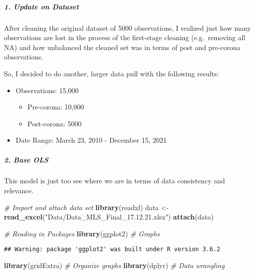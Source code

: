 \documentclass[
]{article}
\newenvironment{Shaded}{\begin{snugshade}}{\end{snugshade}}
\newcommand{\CommentTok}[1]{\textcolor[rgb]{0.56,0.35,0.01}{\textit{#1}}}
\newcommand{\KeywordTok}[1]{\textcolor[rgb]{0.13,0.29,0.53}{\textbf{#1}}}
\newcommand{\NormalTok}[1]{#1}
\newcommand{\StringTok}[1]{\textcolor[rgb]{0.31,0.60,0.02}{#1}}
\providecommand{\tightlist}{%
  \setlength{\itemsep}{0pt}\setlength{\parskip}{0pt}}
\begin{document}
\hypertarget{update-on-dataset}{%
\subparagraph{1. Update on Dataset}\label{update-on-dataset}}

After cleaning the original dataset of 5000 observations, I realized
just how many observations are lost in the process of the first-stage
cleaning (e.g.~removing all NA) and how unbalanced the cleaned set was
in terms of post and pre-corona observations.

So, I decided to do another, larger data pull with the following
results:

\begin{itemize}
\tightlist
\item
  Observations: 15,000

  \begin{itemize}
  \tightlist
  \item
    Pre-corona: 10,000
  \item
    Post-corona: 5000
  \end{itemize}
\item
  Date Range: March 23, 2010 - December 15, 2021
\end{itemize}

\hypertarget{base-ols}{%
\subparagraph{2. Base OLS}\label{base-ols}}

This model is just too see where we are in terms of data consistency and
relevance.

\begin{Shaded}
\begin{Highlighting}[]
\CommentTok{# Import and attach data set }
\KeywordTok{library}\NormalTok{(readxl)}
\NormalTok{data <-}\StringTok{ }\KeywordTok{read_excel}\NormalTok{(}\StringTok{"Data/Data_MLS_Final_17.12.21.xlsx"}\NormalTok{)}
\KeywordTok{attach}\NormalTok{(data)}

\CommentTok{# Reading in Packages}
\KeywordTok{library}\NormalTok{(ggplot2) }\CommentTok{# Graphs}
\end{Highlighting}
\end{Shaded}

\begin{verbatim}
## Warning: package 'ggplot2' was built under R version 3.6.2
\end{verbatim}

\begin{Shaded}
\begin{Highlighting}[]
\KeywordTok{library}\NormalTok{(gridExtra) }\CommentTok{# Organize graphs}
\KeywordTok{library}\NormalTok{(dplyr) }\CommentTok{# Data wrangling}
\end{Highlighting}
\end{Shaded}
\end{document}
